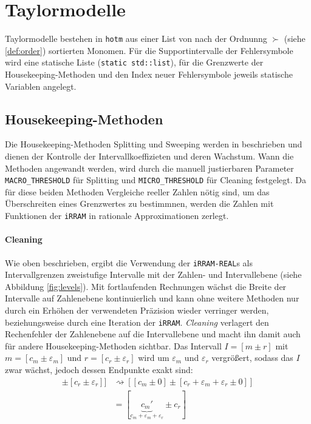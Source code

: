 \newpage
\section{Taylormodelle}
Taylormodelle bestehen in \verb+hotm+ aus einer List von nach der Ordnunng $\succ$ (siehe \ref{def:order}) sortierten Monomen. Für die Supportintervalle der Fehlersymbole wird eine statische Liste (\verb+static std::list+), für die Grenzwerte der Housekeeping-Methoden und den Index neuer Fehlersymbole jeweils statische Variablen angelegt.
\subsection{Housekeeping-Methoden}
Die Housekeeping-Methoden Splitting und Sweeping werden in \cite{DBLP:conf/macis/BrausseKM15} beschrieben und dienen der Kontrolle der Intervallkoeffizieten und deren Wachstum. Wann die Methoden angewandt werden, wird durch die manuell justierbaren Parameter \verb+MACRO_THRESHOLD+ für Splitting und \verb+MICRO_THRESHOLD+ für Cleaning festgelegt. Da für diese beiden Methoden Vergleiche reeller Zahlen nötig sind, um das Überschreiten eines Grenzwertes zu bestimmnen, werden die Zahlen mit Funktionen der \verb+iRRAM+ in rationale Approximationen zerlegt.

\paragraph{Cleaning}
\label{par:cleaning}
Wie oben beschrieben, ergibt die Verwendung der \verb+iRRAM-REAL+s als Intervallgrenzen zweistufige Intervalle mit der Zahlen- und Intervallebene (siehe Abbildung \ref{fig:levels}). Mit fortlaufenden Rechnungen wächst die Breite der Intervalle auf Zahlenebene kontinuierlich und kann ohne weitere Methoden nur durch ein Erhöhen der verwendeten Präzision wieder verringer werden, beziehungsweise durch eine Iteration der \verb+iRRAM+. \textit{Cleaning} verlagert den Rechenfehler der Zahlenebene auf die Intervallebene und macht ihn damit auch für andere Housekeeping-Methoden sichtbar. Das Intervall $I=[m \pm r]$ mit $m=[c_m \pm \varepsilon_m]$ und $r = [c_r \pm \varepsilon_r]$ wird um $\varepsilon_m$ und $\varepsilon_r$ vergrößert, sodass das $I$ zwar wächst, jedoch dessen Endpunkte exakt sind:
\begin{align*}[[c_m \pm \varepsilon_m] \pm [c_r \pm \varepsilon_r]] &\rightsquigarrow [[c_m \pm 0] \pm [c_r + \varepsilon_m +\varepsilon_r  \pm 0]] \\
&= [\underbrace{c_m'}_{c_m + \varepsilon_m +\varepsilon_r} \pm c_r ]\end{align*}
    
